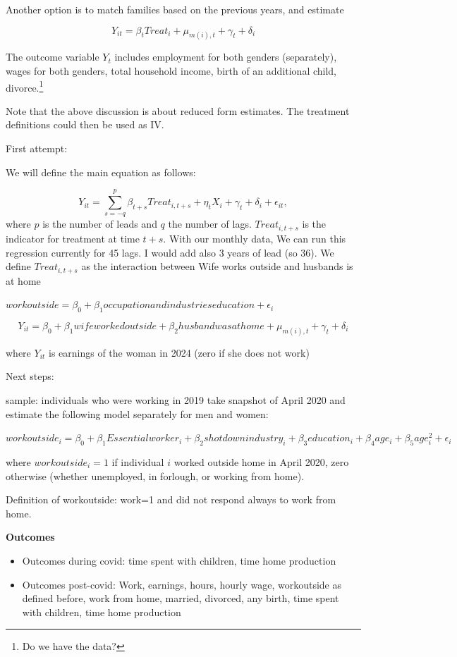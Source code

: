 \documentclass{article}
\begin{document}
Another option is to match families based on the previous years, and estimate 

$$Y_{it}=\beta_tTreat_i+\mu_{m(i),t}+\gamma_t+\delta_i$$


The outcome variable $Y_t$ includes employment for both genders (separately), wages for both genders, total household income, birth of an additional child, divorce.\footnote{Do we have the data?}

Note that the above discussion is about reduced form estimates. The treatment definitions could then be used as IV. 


First attempt:

We will define the main equation as follows:

\begin{equation} \label{eq:simple_event}
Y_{it}=\sum_{s=-q}^{p}\beta_{t+s}Treat_{i,t+s}+\eta_t X_{i}+\gamma_t+\delta_i+\epsilon_{it},
\end{equation}
where $p$ is the number of leads and $q$ the number of lags. $Treat_{i,t+s}$ is the indicator for treatment at time $t+s$. With our monthly data, We can run this regression currently for 45 lags. I would add also 3 years of lead (so 36). 
We define $Treat_{i,t+s}$ as the interaction between Wife works outside and husbands is at home

$workoutside = \beta_0+\beta_1 occupation and industries education+\epsilon_i$


$$Y_{it}=\beta_0 + \beta_1 wifeworkedoutside +\beta_2 husbandwasathome +\mu_{m(i),t}+\gamma_t+\delta_i$$

where $Y_{it}$ is earnings of the woman in 2024 (zero if she does not work)

Next steps:

sample: individuals who were working in 2019
take snapshot of April 2020 and estimate the following model separately for men and women:

$workoutside_i = \beta_0+\beta_1 Essential worker_i +\beta_2 shotdown industry_i+\beta_3 education_i + \beta_4 age_i +\beta_5 age^2_i+ \epsilon_i$

where $workoutside_i=1$ if individual $i$ worked outside home in April 2020, zero otherwise (whether unemployed, in forlough, or working from home).

Definition of workoutside: work=1 and did not respond always to work from home.

\textbf{Outcomes}
\begin{itemize}
    \item Outcomes during covid: time spent with children, time home production
    \item Outcomes post-covid: Work, earnings, hours, hourly wage, workoutside as defined before, work from home, married, divorced, any birth, time spent with children, time home production
\end{itemize}
\end{document}
